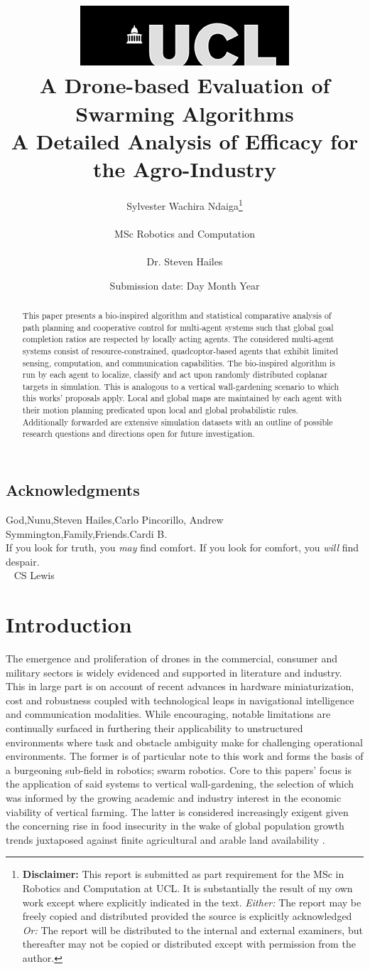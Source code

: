 \documentclass{report}
\title{  	{ \includegraphics[scale=.5]{ucl_logo.png} }\\
{{\Huge A Drone-based Evaluation of Swarming Algorithms}}\\
{\large A Detailed Analysis of Efficacy for the Agro-Industry}\\
		}
\date{Submission date: Day Month Year}
\author{Sylvester Wachira Ndaiga\thanks{
{\bf Disclaimer:}
This report is submitted as part requirement for the MSc in Robotics and Computation at UCL. It is
substantially the result of my own work except where explicitly indicated in the text.
\emph{Either:} The report may be freely copied and distributed provided the source is explicitly acknowledged
\newline  %
\emph{Or:}\newline
The report will be distributed to the internal and external examiners, but thereafter may not be copied or distributed except with permission from the author.}
\\ \\
MSc Robotics and Computation\\ \\
Dr. Steven Hailes}
\begin{document}
 
\onehalfspacing
\maketitle
\begin{abstract}
This paper presents a bio-inspired algorithm and statistical comparative analysis of path planning and cooperative control for multi-agent systems such that global goal completion ratios are respected by locally acting agents. The considered multi-agent systems consist of resource-constrained, quadcoptor-based agents that exhibit limited sensing, computation, and communication capabilities. The bio-inspired algorithm is run by each agent to localize, classify and act upon randomly distributed coplanar targets in simulation. This is analogous to a vertical wall-gardening scenario to which this works' proposals apply. Local and global maps are maintained by each agent with their motion planning predicated upon local and global probabilistic rules. Additionally forwarded are extensive simulation datasets with an outline of possible research questions and directions open for future investigation.
\end{abstract}
\tableofcontents
\setcounter{page}{1}

\newpage
\section*{Acknowledgments}
God,Nunu,Steven Hailes,Carlo Pincorillo, Andrew Symmington,Family,Friends.Cardi B.
\vspace{5cm}
\\
If you look for truth, you \textit{may} find comfort.
If you look for comfort, you \textit{will} find despair.
\\
~ CS Lewis

\chapter{Introduction}

The emergence and proliferation of drones in the commercial, consumer and military sectors is widely evidenced and supported in literature and industry. This in large part is on account of recent advances in hardware miniaturization, cost and robustness coupled with technological leaps in navigational intelligence and communication modalities. While encouraging, notable limitations are continually surfaced in furthering their applicability to unstructured environments where task and obstacle ambiguity make for challenging operational environments. The former is of particular note to this work and forms the basis of a burgeoning sub-field in robotics; swarm robotics. Core to this papers' focus is the application of said systems to vertical wall-gardening, the selection of which was informed by the growing academic and industry \cite{Gmi2017} interest in the economic viability of vertical farming. The latter is considered increasingly exigent given the concerning rise in food insecurity \cite{Yang2018} in the wake of global population growth trends juxtaposed against finite agricultural and arable land availability \cite{Banerjee2014}.
\end{document}
